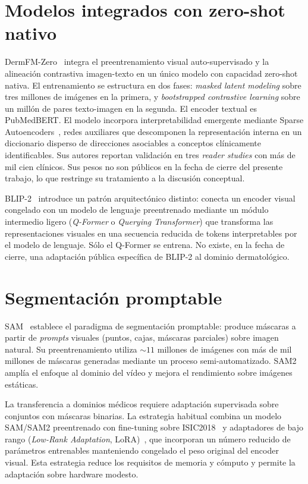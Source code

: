 \section{Modelos integrados con zero-shot nativo}
\label{sec:zero-shot-nativo}

DermFM-Zero~\cite{dermfmzero2026} integra el preentrenamiento visual
auto-supervisado y la alineación contrastiva imagen-texto en un
único modelo con capacidad zero-shot nativa. El entrenamiento se
estructura en dos fases: \emph{masked latent modeling} sobre tres
millones de imágenes en la primera, y \emph{bootstrapped contrastive
learning} sobre un millón de pares texto-imagen en la segunda. El
encoder textual es PubMedBERT. El modelo incorpora interpretabilidad
emergente mediante Sparse Autoencoders~\cite{templeton2024}, redes
auxiliares que descomponen la representación interna en un
diccionario disperso de direcciones asociables a conceptos
clínicamente identificables. Sus autores reportan validación en
tres \emph{reader studies} con más de mil cien clínicos. Sus pesos
no son públicos en la fecha de cierre del presente trabajo, lo que
restringe su tratamiento a la discusión conceptual.

BLIP-2~\cite{blip2_2023} introduce un patrón arquitectónico
distinto: conecta un encoder visual congelado con un modelo de
lenguaje preentrenado mediante un módulo intermedio ligero
(\emph{Q-Former} o \emph{Querying Transformer}) que transforma las
representaciones visuales en una secuencia reducida de tokens
interpretables por el modelo de lenguaje. Sólo el Q-Former se
entrena. No existe, en la fecha de cierre, una adaptación pública
específica de BLIP-2 al dominio dermatológico.

\section{Segmentación promptable}
\label{sec:segmentacion-sota}

SAM~\cite{sam2023} establece el paradigma de segmentación
promptable: produce máscaras a partir de \emph{prompts} visuales
(puntos, cajas, máscaras parciales) sobre imagen natural. Su
preentrenamiento utiliza $\sim 11$ millones de imágenes con
más de mil millones de máscaras generadas mediante un proceso
semi-automatizado. SAM2~\cite{sam2} amplía el enfoque al dominio
del vídeo y mejora el rendimiento sobre imágenes estáticas.

La transferencia a dominios médicos requiere adaptación supervisada
sobre conjuntos con máscaras binarias. La estrategia habitual
combina un modelo SAM/SAM2 preentrenado con fine-tuning sobre
ISIC2018~\cite{isic2018} y adaptadores de bajo rango
(\emph{Low-Rank Adaptation}, LoRA)~\cite{lora}, que
incorporan un número reducido de parámetros entrenables manteniendo
congelado el peso original del encoder visual. Esta estrategia
reduce los requisitos de memoria y cómputo y permite la adaptación
sobre hardware modesto.

